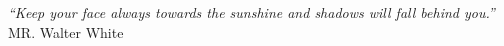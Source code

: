 \thispagestyle{plain}

\vspace*{8cm}

\begin{flushright}
   \textsl{``Keep your face always towards the sunshine and shadows will fall behind you.''} \\
\vspace*{1.5cm}
           MR. Walter White
\end{flushright}
